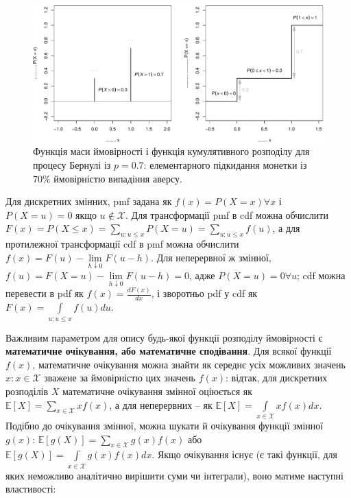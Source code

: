 \documentclass[
  11pt,
]{book}
\begin{document}
\begin{figure}
\centering
\includegraphics{bookdown-demo_files/figure-latex/fig-3-9-1.pdf}
\caption{Функція маси ймовірності і функція кумулятивного розподілу для
процесу Бернулі із \(p = 0.7\): елементарного підкидання монетки із
\(70 \%\) ймовірністю випадіння аверсу.}
\end{figure}

Для дискретних змінних, pmf задана як \(f(x) = P(X = x) \forall x\) і
\(P(X = u) = 0\) якщо \(u \notin \mathcal{X}\). Для трансформації pmf в
cdf можна обчислити
\(F(x) = P(X \leq x) = \sum \limits_{u: u \leq x} P(X = u) = \sum \limits_{u: u \leq x} f(u)\),
а для протилежної трансформації cdf в pmf можна обчислити
\(f(x) = F(u) - \lim \limits_{h \downarrow 0} F(u - h)\). Для
неперервної ж змінної,
\(f(u) = F(X = u) - \lim \limits_{h \downarrow 0} F(u - h) = 0\), адже
\(P(X = u) = 0 \forall u\); cdf можна перевести в pdf як
\(f(x) = \frac{d F(x)}{d x}\), і зворотньо pdf у cdf як
\(F(x) = \int \limits_{u: u \leq x} f(u) du\).

Важливим параметром для опису будь-якої функції розподілу ймовірності є
\textbf{математичне очікування, або математичне сподівання}. Для всякої
функції \(f(x)\), математичне очікування можна знайти як середнє усіх
можливих значень \(x: x \in \mathcal{X}\) зважене за ймовірністю цих
значень \(f(x)\): відтак, для дискретних розподілів \(X\) математичне
очікування змінної оціюється як
\(\mathbb{E}[X] = \sum \limits_{x \in \mathcal{X}} x f(x)\), а для
неперервних -- як
\(\mathbb{E}[X] = \int \limits_{x \in \mathcal{X}} x f(x) dx\). Подібно
до очікування змінної, можна шукати й очікування функції змінної
\(g(x)\):
\(\mathbb{E}[g(X)] = \sum \limits_{x \in \mathcal{X}} g(x) f(x)\) або
\(\mathbb{E}[g(X)] = \int \limits_{x \in \mathcal{X}} g(x) f(x) dx\).
Якщо очікування існує (є такі функції, для яких неможливо аналітично
вирішити суми чи інтеграли), воно матиме наступні властивості:
\end{document}
